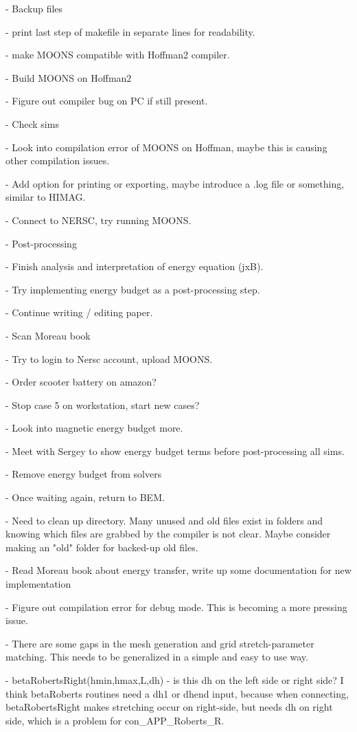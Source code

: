 \documentclass[11pt]{article}
\begin{document}
- Backup files

- print last step of makefile in separate lines for readability.

- make MOONS compatible with Hoffman2 compiler.

- Build MOONS on Hoffman2

- Figure out compiler bug on PC if still present.

- Check sims

- Look into compilation error of MOONS on Hoffman, maybe this is causing other compilation issues.

- Add option for printing or exporting, maybe introduce a .log file or something, similar to HIMAG.

- Connect to NERSC, try running MOONS.

- Post-processing

- Finish analysis and interpretation of energy equation (jxB).

- Try implementing energy budget as a post-processing step.

- Continue writing / editing paper.

- Scan Moreau book

- Try to login to Nersc account, upload MOONS.

- Order scooter battery on amazon?

- Stop case 5 on workstation, start new cases?

- Look into magnetic energy budget more.

- Meet with Sergey to show energy budget terms before post-processing all sims.

- Remove energy budget from solvers

- Once waiting again, return to BEM.

- Need to clean up directory. Many unused and old files exist in folders and knowing which files are grabbed by the compiler is not clear. Maybe consider making an "old" folder for backed-up old files.

- Read Moreau book about energy transfer, write up some documentation for new implementation

- Figure out compilation error for debug mode. This is becoming a more pressing issue.

- There are some gaps in the mesh generation and grid stretch-parameter matching. This needs to be generalized in a simple and easy to use way.

- betaRobertsRight(hmin,hmax,L,dh) - is this dh on the left side or right side? I think betaRoberts routines need a dh1 or dhend input, because when connecting, betaRobertsRight makes stretching occur on right-side, but needs dh on right side, which is a problem for con\_APP\_Roberts\_R.
\end{document}
